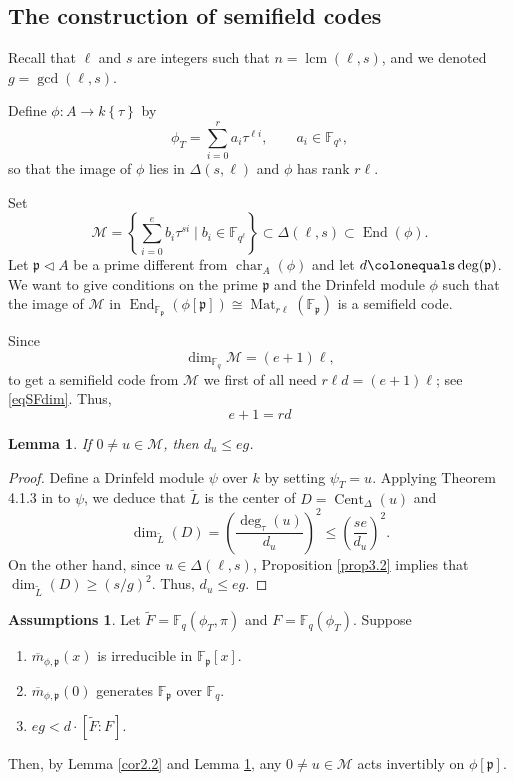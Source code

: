 \documentclass[12pt]{amsart}
\newtheorem{lem}[thm]{Lemma}
\theoremstyle{definition}
\newtheorem{assumptions}[thm]{Assumptions}
\theoremstyle{remark}
\numberwithin{equation}{section}
\numberwithin{thm}{section}
\DeclareMathOperator{\End}{End}
\DeclareMathOperator{\chr}{char}
\DeclareMathOperator{\Mat}{Mat}
\DeclareMathOperator{\Cent}{Cent}
\DeclareMathOperator{\lcm}{lcm}
\newcommand{\fp}{\mathfrak{p}}
\newcommand{\cM}{\mathcal{M}}
\newcommand{\F}{\mathbb{F}}
\newcommand{\tF}{\widetilde{F}}
\newcommand{\twist}[1]{#1\!\left\{\tau\right\}}
\begin{document}

\subsection{The construction of semifield codes} Recall that $\ell$ and $s$ are integers such that $n=\lcm(\ell, s)$, and we denoted 
$g=\gcd(\ell, s)$. 

Define $\phi\colon A\to \twist{k}$ by 
\begin{equation}\label{eqDefphi}
\phi_T=\sum_{i=0}^r a_i \tau^{\ell i}, \qquad a_i\in \F_{q^s}, 
\end{equation}
so that the image of $\phi$ lies in $\Delta(s, \ell)$ and $\phi$ has rank $r\ell$. 

Set 
$$
\cM=\left\{\sum_{i=0}^e b_i\tau^{s i}\mid b_i\in \F_{q^\ell}\right\}\subset \Delta(\ell, s)\subset \End(\phi). 
$$
Let $\fp\lhd A$ be a prime different from $\chr_A(\phi)$ and let $d\colonequals \deg(\fp)$. 
We want to give conditions on the prime $\fp$ and the Drinfeld module $\phi$ such that 
the image of $\cM$ in $\End_{\F_\fp}(\phi[\fp])\cong  \Mat_{r\ell}(\F_\fp)$ is a semifield code. 

Since $$\dim_{\F_q}\cM=(e+1)\ell, $$ to get a semifield code from $\cM$ we first of all need 
$
r\ell d= (e+1)\ell$; see \eqref{eqSFdim}. Thus,  
$$
\boxed{e+1=r d}
$$


\begin{lem}\label{lem1.10M} If $0\neq u\in \cM$, then $d_u\leq eg$. 
\end{lem}
\begin{proof} 
	Define a Drinfeld module $\psi$ over $k$ by setting $\psi_T=u$. Applying Theorem 4.1.3 in \cite{PapikianGTM} to $\psi$, we deduce that  
	$\widetilde{L}$ is the center of $D=\Cent_\Delta(u)$ and 
	$$
	\dim_{\widetilde{L}}(D)=\left(\frac{\deg_\tau(u)}{d_u}\right)^2 \leq \left(\frac{se}{d_u}\right)^2. 
	$$
	On the other hand, since $u\in \Delta(\ell, s)$, Proposition \ref{prop3.2} implies that 
	$
	\dim_{\widetilde{L}}(D) \geq (s/g)^2$. 
	Thus, $d_u\leq eg$. 
\end{proof}

\begin{assumptions}
Let $\tF=\F_q(\phi_T, \pi)$ and $F=\F_q(\phi_T)$. Suppose 
\begin{enumerate}
	\item $\overline{m}_{\phi, \fp}(x)$ is irreducible in $\F_\fp[x]$.
	\item $\overline{m}_{\phi, \fp}(0)$ generates $\F_\fp$ over $\F_q$. 
	\item $eg<d\cdot [\tF:F]$. 
\end{enumerate}
Then, by  Lemma \ref{cor2.2} and Lemma \ref{lem1.10M}, any $0\neq u\in \cM$ acts invertibly on $\phi[\fp]$. 
\end{assumptions}
\end{document}
